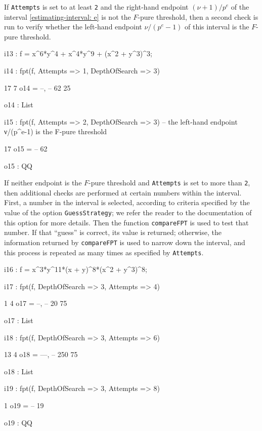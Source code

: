 \documentclass{amsart}
\begin{document}
If  \texttt{Attempts} is set to at least \texttt{2} and the right-hand endpoint $(\nu+1)/p^e$ of the interval \eqref{estimating-interval: e} is not the $F$-pure threshold, then a second check is run to verify whether the left-hand endpoint $\nu/(p^e-1)$ of this interval is the $F$-pure threshold.

\smallskip
{\small
{}
\begin{MyVerbatim}
i13 : f = x^6*y^4 + x^4*y^9 + (x^2 + y^3)^3;

i14 : fpt(f, Attempts => 1, DepthOfSearch => 3)

       17   7
o14 = {--, --}
       62  25

o14 : List

i15 : fpt(f, Attempts => 2, DepthOfSearch => 3) -- the left-hand endpoint
      ν/(p^e-1) is the F-pure threshold

      17
o15 = --
      62

o15 : QQ
\end{MyVerbatim}
}
\smallskip

If neither endpoint is the $F$-pure threshold and \texttt{Attempts} is set to more than \texttt{2}, then  additional checks are performed at certain numbers within the interval.
First, a number in the interval is selected, according to criteria specified by the value of the option \texttt{GuessStrategy}; we refer the reader to the documentation of this option for more details.
Then the function \texttt{compareFPT} is used to test that number. If that ``guess'' is correct, its value is returned; otherwise, the information returned by \texttt{compareFPT} is used to narrow down the interval, and this process is repeated as many times as specified by \texttt{Attempts}.

\smallskip
{\small
{}
\begin{MyVerbatim}
i16 : f = x^3*y^11*(x + y)^8*(x^2 + y^3)^8;

i17 : fpt(f, DepthOfSearch => 3, Attempts => 4)

        1   4
o17 = {--, --}
       20  75

o17 : List

i18 : fpt(f, DepthOfSearch => 3, Attempts => 6)

        13   4
o18 = {---, --}
       250  75

o18 : List

i19 : fpt(f, DepthOfSearch => 3, Attempts => 8) 

       1
o19 = --
      19

o19 : QQ
\end{MyVerbatim}
}
\smallskip
\end{document}
